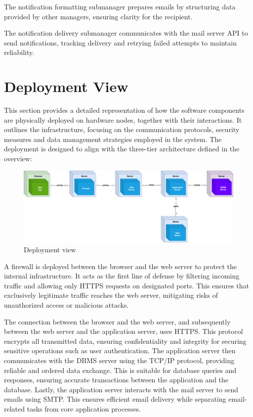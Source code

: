 The notification formatting submanager prepares emails by structuring data provided by other managers, ensuring clarity for the recipient.

The notification delivery submanager communicates with the mail server API to send notifications, tracking delivery and retrying failed attempts to maintain reliability.

\section{Deployment View}
This section provides a detailed representation of how the software components are physically deployed on hardware nodes, together with their interactions.
It outlines the infrastructure, focusing on the communication protocols, security measures and data management strategies employed in the system.
The deployment is designed to align with the three-tier architecture defined in the overview:

\begin{figure}[h]
    \centering
    \includegraphics[width=16cm]{images/deployment-view.png}
    \caption{Deployment view}
\end{figure}

A firewall is deployed between the browser and the web server to protect the internal infrastructure.
It acts as the first line of defense by filtering incoming traffic and allowing only HTTPS requests on designated ports.
This ensures that exclusively legitimate traffic reaches the web server, mitigating risks of unauthorized access or malicious attacks.

The connection between the browser and the web server, and subsequently between the web server and the application server, uses HTTPS.
This protocol encrypts all transmitted data, ensuring confidentiality and integrity for securing sensitive operations such as user authentication.
The application server then communicates with the DBMS server using the TCP/IP protocol, providing reliable and ordered data exchange.
This is suitable for database queries and responses, ensuring accurate transactions between the application and the database.
Lastly, the application server interacts with the mail server to send emails using SMTP.
This ensures efficient email delivery while separating email-related tasks from core application processes.

